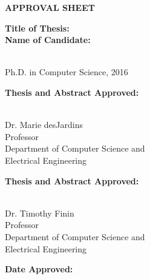 \newpage
\begin{titlepage}
\vspace{0.6in}
\begin{singlespace}

\begin{center}
\vspace{0.1in}
\large{\bf APPROVAL SHEET}
\bigskip \bigskip
\end{center}

\begin{flushleft}
{\bf Title of Thesis:}{\hspace{3mm}}\thesistitle{}\\
\vspace{0.5in}
{\bf Name of Candidate:}{\hspace{3mm}} \parbox[t]{2in}{\fullname{} \\ Ph.D. in Computer Science, 2016}
\end{flushleft}

\vspace{0.5in}

\begin{flushleft}
{\bf Thesis and Abstract Approved:}{\hspace{3mm}} 
\parbox[t]{2.5in}{\underline{\hspace{2.0in}}\\ 
	Dr. Marie desJardins \\
	Professor \\
	Department of Computer Science and \\
	Electrical Engineering}
\end{flushleft}

\vspace{0.5in}

\begin{flushleft}
{\bf Thesis and Abstract Approved:}{\hspace{3mm}} 
\parbox[t]{2.5in}{\underline{\hspace{2.0in}}\\ 
	Dr. Timothy Finin \\
	Professor \\
	Department of Computer Science and \\
	Electrical Engineering}
\end{flushleft}

\vspace{0.8in}

\begin{flushleft}
{\bf Date Approved:}{\hspace{3mm}} \underline{\hspace{2.5in}}\\
\end{flushleft}

\end{singlespace}
\end{titlepage}
\par\vfil
